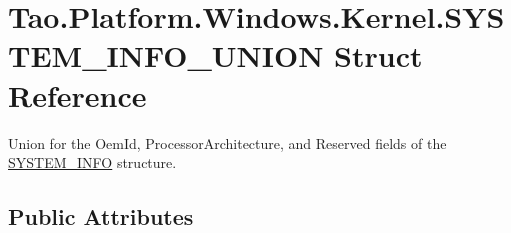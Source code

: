 \hypertarget{struct_tao_1_1_platform_1_1_windows_1_1_kernel_1_1_s_y_s_t_e_m___i_n_f_o___u_n_i_o_n}{
\section{Tao.Platform.Windows.Kernel.SYSTEM\_\-INFO\_\-UNION Struct Reference}
\label{struct_tao_1_1_platform_1_1_windows_1_1_kernel_1_1_s_y_s_t_e_m___i_n_f_o___u_n_i_o_n}
}


Union for the OemId, ProcessorArchitecture, and Reserved fields of the \hyperlink{struct_tao_1_1_platform_1_1_windows_1_1_kernel_1_1_s_y_s_t_e_m___i_n_f_o}{SYSTEM\_\-INFO} structure.  


\subsection*{Public Attributes}
